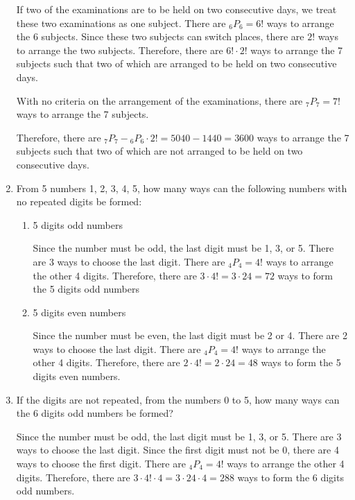 \documentclass{report}
\newcommand\permtwo[2][^n]{{}_{#1}P_{#2}}
\begin{document}
\begin{multicols}{2}
\begin{enumerate}
          If two of the examinations are to be held on two consecutive days, we treat
          these two examinations as one subject. There are $\permtwo[6]{6} = 6!$ ways to
          arrange the 6 subjects. Since these two subjects can switch places, there are
          $2!$ ways to arrange the two subjects. Therefore, there are $6! \cdot 2!$ ways
          to arrange the 7 subjects such that two of which are arranged to be held on two
          consecutive days.

          With no criteria on the arrangement of the examinations, there are
          $\permtwo[7]{7} = 7!$ ways to arrange the 7 subjects.

          Therefore, there are $\permtwo[7]{7} - \permtwo[6]{6} \cdot 2! = 5040 - 1440 =
            3600$ ways to arrange the 7 subjects such that two of which are not arranged to
          be held on two consecutive days.

    \item From 5 numbers 1, 2, 3, 4, 5, how many ways can the following numbers with no
          repeated digits be formed:
          \begin{enumerate}
            \item 5 digits odd numbers
                  \sol{}

                  Since the number must be odd, the last digit must be 1, 3, or 5. There are 3
                  ways to choose the last digit. There are $\permtwo[4]{4} = 4!$ ways to arrange
                  the other 4 digits. Therefore, there are $3 \cdot 4! = 3 \cdot 24 = 72$ ways to
                  form the 5 digits odd numbers

            \item 5 digits even numbers
                  \sol{}

                  Since the number must be even, the last digit must be 2 or 4. There are 2 ways
                  to choose the last digit. There are $\permtwo[4]{4} = 4!$ ways to arrange the
                  other 4 digits. Therefore, there are $2 \cdot 4! = 2 \cdot 24 = 48$ ways to
                  form the 5 digits even numbers.
          \end{enumerate}

    \item If the digits are not repeated, from the numbers 0 to 5, how many ways can the
          6 digits odd numbers be formed? \sol{}

          Since the number must be odd, the last digit must be 1, 3, or 5. There are 3
          ways to choose the last digit. Since the first digit must not be 0, there are 4
          ways to choose the first digit. There are $\permtwo[4]{4} = 4!$ ways to arrange
          the other 4 digits. Therefore, there are $3 \cdot 4! \cdot 4 = 3 \cdot 24 \cdot
            4 = 288$ ways to form the 6 digits odd numbers.


\end{enumerate}
\end{multicols}
\end{document}
